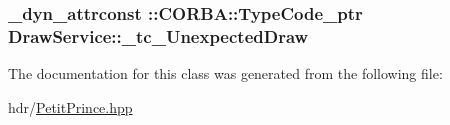 \subsubsection[{\texorpdfstring{\+\_\+tc\+\_\+\+Unexpected\+Draw}{_tc_UnexpectedDraw}}]{\setlength{\rightskip}{0pt plus 5cm}\+\_\+dyn\+\_\+attrconst \+::C\+O\+R\+B\+A\+::\+Type\+Code\+\_\+ptr Draw\+Service\+::\+\_\+tc\+\_\+\+Unexpected\+Draw\hspace{0.3cm}{\ttfamily [static]}}\hypertarget{class_draw_service_a20a8de19b0f9d322579bf636ca2dd1e6}{}\label{class_draw_service_a20a8de19b0f9d322579bf636ca2dd1e6}


The documentation for this class was generated from the following file\+:\begin{DoxyCompactItemize}
\item 
hdr/\hyperlink{_petit_prince_8hpp}{Petit\+Prince.\+hpp}\end{DoxyCompactItemize}
